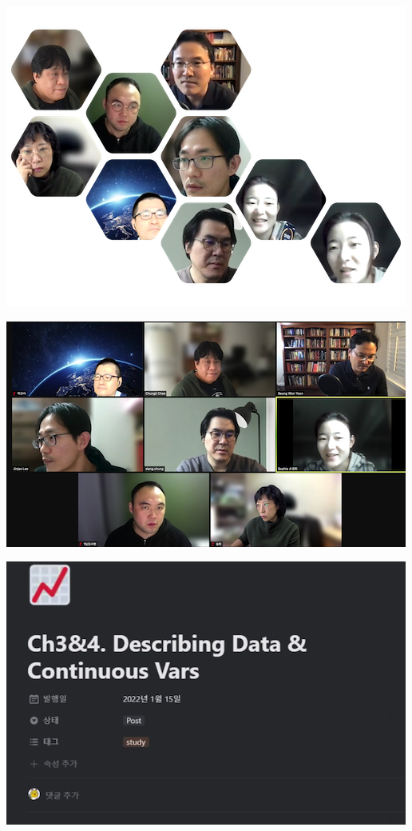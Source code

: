 \documentclass[
]{book}
\begin{document}
\includegraphics{img/s2/3.png}

\includegraphics{img/s2/1.png}

\includegraphics{img/s2/2.png}

  
\end{document}
